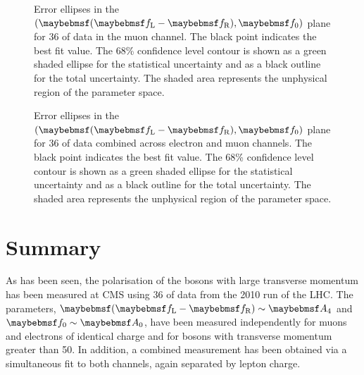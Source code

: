 \begin{figure}[h!]
\centering
{}\quad
{}
\caption[Error ellipses in the $(\fLmfR, \f0)$ plane for the muon channel]{Error ellipses in the $(\fLmfR, \f0)$ plane for
  \unit{36}{\invpb} of data in the muon channel. The black point indicates the
  best fit value. The 68\% confidence level contour is shown as a green shaded
  ellipse for the statistical uncertainty and as a black outline for the total
  uncertainty. The shaded area represents the unphysical region of the parameter
  space.}
\label{fig:wpol_contour_mu}
\end{figure}


\begin{figure}[h!]
\centering
{}\quad
{}
\caption[Error ellipses in the $(\fLmfR, \f0)$ plane for the combined fit]{Error ellipses in the $(\fLmfR, \f0)$ plane for
  \unit{36}{\invpb} of data combined across electron and muon channels. The
  black point indicates the best fit value. The 68\% confidence level contour is
  shown as a green shaded ellipse for the statistical uncertainty and as a black
  outline for the total uncertainty. The shaded area represents the unphysical
  region of the parameter space.}
\label{fig:wpol_contour_comb}
\end{figure}







\section{Summary}
As has been seen, the polarisation of the \PW bosons with large transverse
momentum has been measured at \ac{CMS} using \unit{36}{\invpb} of data from the
2010 run of the \ac{LHC}. The parameters, $\fLmfR \sim \Afour$ and
$\f0\sim\Azero$, have been measured independently for muons and electrons of
identical charge and for \PW bosons with transverse momentum greater than
\unit{50}{\GeV}. In addition, a combined measurement has been obtained via a
simultaneous fit to both channels, again separated by lepton charge.

